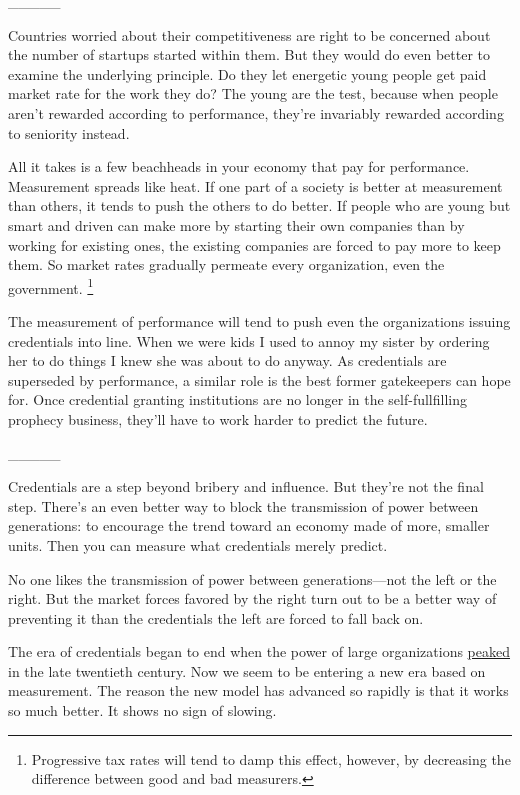 \documentclass[12pt]{book}
\begin{document}
\_\_\_\_\_

Countries worried about their competitiveness are right to be concerned
about the number of startups started within them. But they would do even
better to examine the underlying principle. Do they let energetic young
people get paid market rate for the work they do? The young are the
test, because when people aren't rewarded according to performance,
they're invariably rewarded according to seniority instead.

All it takes is a few beachheads in your economy that pay for
performance. Measurement spreads like heat. If one part of a society is
better at measurement than others, it tends to push the others to do
better. If people who are young but smart and driven can make more by
starting their own companies than by working for existing ones, the
existing companies are forced to pay more to keep them. So market rates
gradually permeate every organization, even the government.
\footnote{Progressive tax rates will tend to damp this effect, however, by
decreasing the difference between good and bad measurers.}

The measurement of performance will tend to push even the organizations
issuing credentials into line. When we were kids I used to annoy my
sister by ordering her to do things I knew she was about to do anyway.
As credentials are superseded by performance, a similar role is the best
former gatekeepers can hope for. Once credential granting institutions
are no longer in the self-fullfilling prophecy business, they'll have to
work harder to predict the future.

\_\_\_\_\_

Credentials are a step beyond bribery and influence. But they're not the
final step. There's an even better way to block the transmission of
power between generations: to encourage the trend toward an economy made
of more, smaller units. Then you can measure what credentials merely
predict.

No one likes the transmission of power between generations---not the
left or the right. But the market forces favored by the right turn out
to be a better way of preventing it than the credentials the left are
forced to fall back on.

The era of credentials began to end when the power of large
organizations \href{highres.html}{peaked} in the late twentieth century.
Now we seem to be entering a new era based on measurement. The reason
the new model has advanced so rapidly is that it works so much better.
It shows no sign of slowing.
\end{document}
